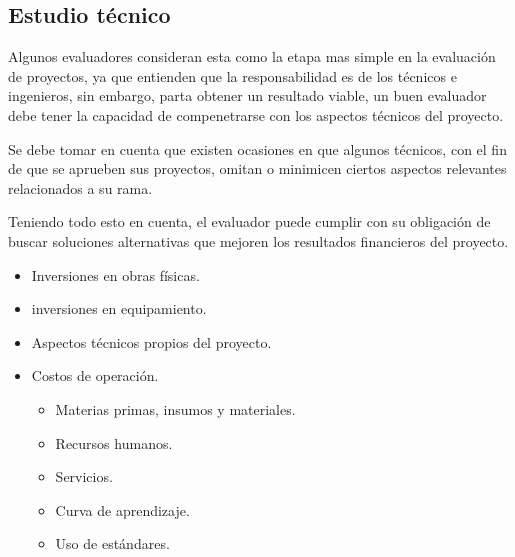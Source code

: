 \documentclass{templateNote}
\begin{document}
\subsection{Estudio técnico}
Algunos evaluadores consideran esta como la etapa mas simple en la evaluación de proyectos, ya que entienden que la responsabilidad es de los técnicos e ingenieros, sin embargo, parta obtener un resultado viable, un buen evaluador debe tener la capacidad de compenetrarse con los aspectos técnicos del proyecto.

Se debe tomar en cuenta que existen ocasiones en que algunos técnicos, con el fin de que se aprueben sus proyectos, omitan o minimicen ciertos aspectos relevantes relacionados a su rama.

Teniendo todo esto en cuenta, el evaluador puede cumplir con su obligación de buscar soluciones alternativas que mejoren los resultados financieros del proyecto.
\begin{itemize}
    \item Inversiones en obras físicas.
    \item inversiones en equipamiento.
    \item Aspectos técnicos propios del proyecto.
    \item Costos de operación.
    \begin{itemize}
        \item Materias primas, insumos y materiales.
        \item Recursos humanos.
        \item Servicios.
        \item Curva de aprendizaje.
        \item Uso de estándares.
    \end{itemize}
\end{itemize}
\end{document}

